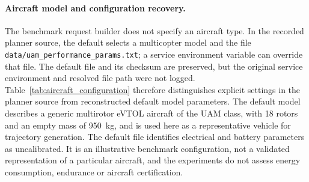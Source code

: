 \paragraph{Aircraft model and configuration recovery.}
The benchmark request builder does not specify an aircraft type. In the recorded planner source, the default selects a multicopter model and the file \nolinkurl{data/uam_performance_params.txt}; a service environment variable can override that file. The default file and its checksum are preserved, but the original service environment and resolved file path were not logged. Table~\ref{tab:aircraft_configuration} therefore distinguishes explicit settings in the planner source from reconstructed default model parameters. The default model describes a generic multirotor eVTOL aircraft of the UAM class, with 18 rotors and an empty mass of \SI{950}{kg}, and is used here as a representative vehicle for trajectory generation. The default file identifies electrical and battery parameters as uncalibrated. It is an illustrative benchmark configuration, not a validated representation of a particular aircraft, and the experiments do not assess energy consumption, endurance or aircraft certification.

